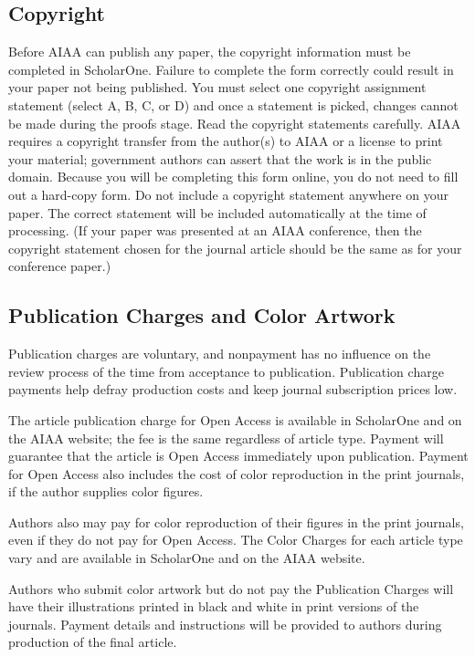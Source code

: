 \documentclass[journal]{new-aiaa}
\begin{document}
\subsection{Copyright}

Before AIAA can publish any paper, the copyright information must be completed in ScholarOne. Failure to complete the form correctly could result in your paper not being published. You must select one copyright assignment statement (select A, B, C, or D) and once a statement is picked, changes cannot be made during the proofs stage. Read the copyright statements carefully. AIAA requires a copyright transfer from the author(s) to AIAA or a license to print your material; government authors can assert that the work is in the public domain. Because you will be completing this form online, you do not need to fill out a hard-copy form. Do not include a copyright statement anywhere on your paper. The correct statement will be included automatically at the time of processing. (If your paper was presented at an AIAA conference, then the copyright statement chosen for the journal article should be the same as for your conference paper.)

\subsection{Publication Charges and Color Artwork}

Publication charges are voluntary, and nonpayment has no influence on the review process of the time from acceptance to publication. Publication charge payments help defray production costs and keep journal subscription prices low. 

The article publication charge for Open Access is available in ScholarOne and on the AIAA website; the fee is the same regardless of article type. Payment will guarantee that the article is Open Access immediately upon publication. Payment for Open Access also includes the cost of color reproduction in the print journals, if the author supplies color figures.

Authors also may pay for color reproduction of their figures in the print journals, even if they do not pay for Open Access. The Color Charges for each article type vary and are available in ScholarOne and on the AIAA website.

Authors who submit color artwork but do not pay the Publication Charges will have their illustrations printed in black and white in print versions of the journals. Payment details and instructions will be provided to authors during production of the final article. 
\end{document}
